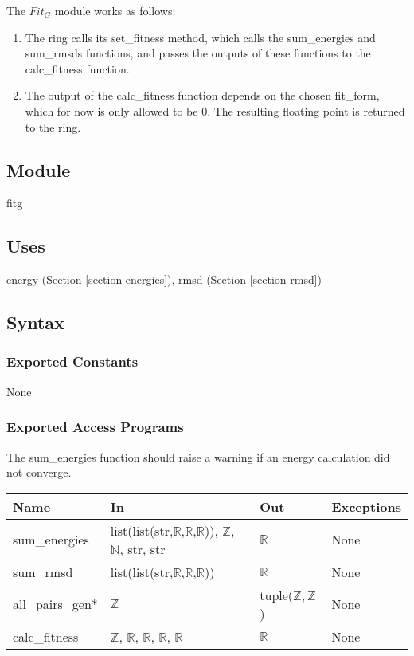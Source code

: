 \documentclass[12pt, titlepage]{article}
\begin{document}
The $Fit_G$ module works as follows:
\begin{enumerate}
	\item The ring calls its set\_fitness method, which calls the sum\_energies 
	and sum\_rmsds functions, and passes the outputs of these functions to the 
	calc\_fitness function.
	\item The output of the calc\_fitness function depends on the chosen 
	fit\_form, which for now is only allowed to be 0. The resulting floating 
	point is returned to the ring.
\end{enumerate}

\subsection{Module}

fitg

\subsection{Uses}

energy (Section \ref{section-energies}), rmsd (Section \ref{section-rmsd})

\subsection{Syntax}

\subsubsection{Exported Constants}

None

\subsubsection{Exported Access Programs}

The sum\_energies function should raise a warning if an energy calculation did 
not converge.

\begin{center}
	\begin{tabular}{p{2cm} p{4cm} p{4cm} p{2cm}}
		\hline
		\textbf{Name} & \textbf{In} & \textbf{Out} & \textbf{Exceptions} \\
		\hline
		sum\_energies &  
		list(list(str,$\mathbb{R}$,$\mathbb{R}$,$\mathbb{R}$)), $\mathbb{Z}$, 
		$\mathbb{N}$, str, str & $\mathbb{R}$ 
		& None \\
		sum\_rmsd &  list(list(str,$\mathbb{R}$,$\mathbb{R}$,$\mathbb{R}$)) & 
		$\mathbb{R}$ & None \\
		all\_pairs\_gen* & $\mathbb{Z}$ & tuple($\mathbb{Z}, \mathbb{Z}$) & 
		None 
		\\
		calc\_fitness & $\mathbb{Z}$, $\mathbb{R}$, $\mathbb{R}$, $\mathbb{R}$, 
		$\mathbb{R}$ & $\mathbb{R}$ & None \\
		\hline
	\end{tabular}
\end{center}
\end{document}
